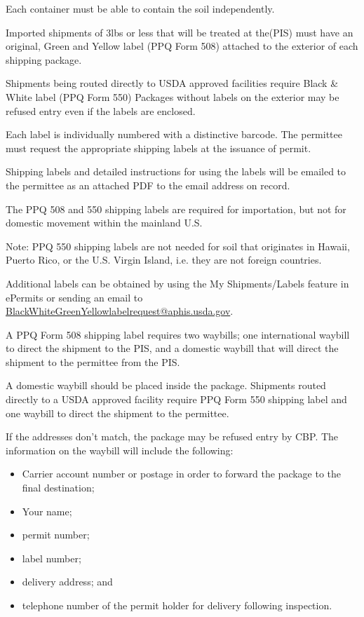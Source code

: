 \documentclass[12pt]{../SOP3}\usepackage[]{graphicx}\usepackage[]{color}
\begin{document}
\NP Each container must be able to contain the soil independently. 

\NP Imported shipments of 3lbs or less that will be treated at the(PIS) must have an original, Green and Yellow label (PPQ Form 508) attached to the exterior of each shipping package. 

\NP Shipments being routed directly to USDA approved facilities require Black \& White label (PPQ Form 550) Packages without labels on the exterior may be refused entry even if the labels are enclosed. 

\NP Each label is individually numbered with a distinctive barcode. The permittee must request the appropriate shipping labels at the issuance of permit. 

\NP Shipping labels and detailed instructions for using the labels will be emailed to the permittee as an attached PDF to the email address on record. 

\NP The PPQ 508 and 550 shipping labels are required for importation, but not for domestic movement within the mainland U.S. 

Note: PPQ 550 shipping labels are not needed for soil that originates in Hawaii, Puerto Rico, or the U.S. Virgin Island, i.e. they are not foreign countries.

\NP Additional labels can be obtained by using the My Shipments/Labels feature in ePermits or sending an email to \url{BlackWhiteGreenYellowlabelrequest@aphis.usda.gov}.

\NP A PPQ Form 508 shipping label requires two waybills; one international waybill to direct the shipment to the PIS, and a domestic waybill that will direct the shipment to the permittee from the PIS. 

\NP A domestic waybill should be placed inside the package. Shipments routed directly to a USDA approved facility require PPQ Form 550 shipping label and one waybill to direct the shipment to the permittee. 

\NP If the addresses don't match, the package may be refused entry by CBP. The information on the waybill will include the following: 

\begin{itemize}
\item Carrier account number or postage in order to forward the package to the final destination; 
\item Your name;
\item permit number; 
\item label number; 
\item delivery address; and 
\item telephone number of the permit holder for delivery following inspection.
\end{itemize}
\end{document}
